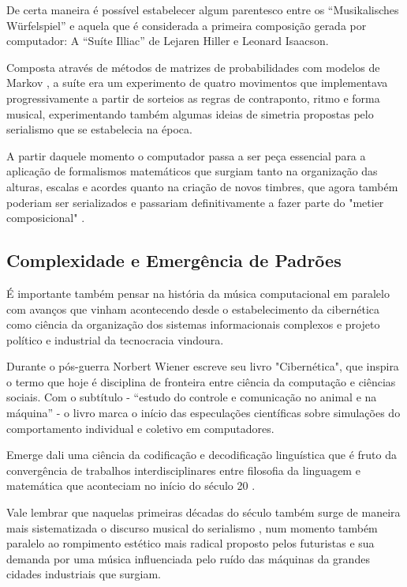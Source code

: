 \documentclass[
	12pt,				%
	openright,			%
	twoside,			%
	a4paper,			%
	english,			%
	french,				%
	spanish,			%
	brazil				%
	]{abntex2}
\begin{document}
De certa maneira é possível estabelecer algum parentesco entre os “Musikalisches Würfelspiel” e aquela que é considerada a primeira composição gerada por computador: A “Suíte Illiac” de Lejaren Hiller e Leonard Isaacson. 

Composta através de métodos de matrizes de probabilidades com modelos de Markov \cite[p. 67-82]{nierhaus2009algorithmic}, a suíte era um experimento de quatro movimentos que implementava progressivamente a partir de sorteios as regras de contraponto, ritmo e forma musical, experimentando também algumas ideias de simetria propostas pelo serialismo que se estabelecia na época. \cite[p. 12]{schwanauer1993machine}

A partir daquele momento o computador passa a ser peça essencial para a aplicação de formalismos matemáticos que surgiam tanto na organização das alturas, escalas e acordes quanto na criação de novos timbres, que agora também poderiam ser serializados e passariam definitivamente a fazer parte do "metier composicional"\cite{stockhausen1996situacao} .


\subsection{Complexidade e Emergência de Padrões}

É importante também pensar na história da música computacional em paralelo com avanços que vinham acontecendo desde o estabelecimento da cibernética como ciência da organização dos sistemas informacionais complexos e projeto político e industrial da tecnocracia vindoura. 

Durante o pós-guerra Norbert Wiener escreve seu livro "Cibernética"\cite{wiener1948cybernetics}, que inspira o termo que hoje é disciplina de fronteira entre ciência da computação e ciências sociais. Com o subtítulo - “estudo do controle e comunicação no animal e na máquina” - o livro marca o início das especulações científicas sobre simulações do comportamento individual e coletivo em computadores.

Emerge dali uma ciência da codificação e decodificação linguística que é fruto da convergência de trabalhos interdisciplinares entre filosofia da linguagem e matemática que aconteciam no início do século 20 \cite[p. 45-62]{nierhaus2009algorithmic}.

Vale lembrar que naquelas primeiras décadas do século também surge de maneira mais sistematizada o discurso musical do serialismo \cite{adorno1974filosofia}, num momento também paralelo ao rompimento estético mais radical proposto pelos futuristas e sua demanda por uma música influenciada pelo ruído das máquinas da grandes cidades industriais que surgiam. \cite{russolo2009arte}
\end{document}
